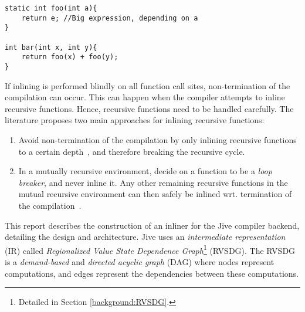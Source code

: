 \begin{centering}
	\noindent\begin{minipage}{\textwidth}
		\begin{CenteredBox}
		\begin{lstlisting}[style=global_customcpp]
static int foo(int a){
	return e; //Big expression, depending on a
}

int bar(int x, int y){
	return foo(x) + foo(y);
}
		\end{lstlisting}
		\end{CenteredBox}
	\end{minipage}
	\label{lst:code-dup}
\end{centering}

If inlining is performed blindly on all function call sites, non-termination of
the compilation can occur. This can happen when the compiler attempts to inline
recursive functions. Hence, recursive functions need to be handled carefully.
The literature proposes two main approaches for inlining recursive functions:

\begin{enumerate}

	\item Avoid non-termination of the compilation by only inlining recursive
functions to a certain depth~\cite{GHCPaper}\cite{InlineWhenHowSerrano}, and
therefore breaking the recursive cycle.

    \item In a mutually recursive environment, decide on a function to be a
\textit{loop breaker}, and never inline it. Any other remaining recursive
functions in the mutual recursive environment can then safely be inlined wrt.
termination of the compilation~\cite{BasMscThesis}\cite{GHCPaper}.

\end{enumerate}

This report describes the construction of an inliner for the Jive compiler
backend, detailing the design and architecture. Jive uses an
\textit{intermediate representation} (IR) called \textit{Regionalized Value
State Dependence Graph}\footnote{Detailed in Section \ref{background:RVSDG}.}
(RVSDG). The RVSDG~\cite{RVSDG:HiPEACpaper} is a \textit{demand-based} and
\textit{directed acyclic graph} (DAG) where nodes represent computations, and
edges represent the dependencies between these computations.

